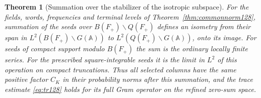 \documentclass[a4paper,11pt]{article}
\newtheorem{theorem}[proposition]{Theorem}
\theoremstyle{definition}
\theoremstyle{remark}
\numberwithin{equation}{section}
\begin{document}
\begin{theorem}[Summation over the stabilizer of the isotropic subspace]
\label{thm:maximal130}
For the fields, words, frequencies and terminal levels of
Theorem~\ref{thm:commonnorm128}, summation of the seeds over
\(B(F_+)\backslash Q(F_+)\) defines an isometry from their span
in \(L^2(B(F_+)\backslash G(\mathbb A))\) to
\(L^2(Q(F_+)\backslash G(\mathbb A))\), onto its image.
For seeds of compact support modulo \(B(F_+)\) the sum is the
ordinary locally finite series. For the prescribed square-integrable
seeds it is the limit in \(L^2\) of this operation on compact
truncations. Thus all selected columns have the same positive
factor \(C_K\) in their probability norms after this summation,
and the trace estimate \eqref{eq:tr128} holds for its full Gram
operator on the refined zero-sum space.
\end{theorem}
\end{document}
